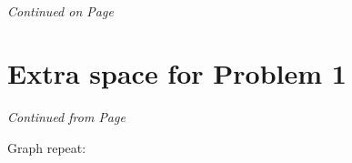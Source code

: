 \documentclass[11pt]{article}
\begin{document}
\label{pg:end-of-p5}


%
\paragraph{} \emph{Continued on Page \pageref{pg:p5-continuation}}


\newpage







\newpage



\section*{Extra space for Problem 1}
\emph{Continued from Page \pageref{pg:end-of-p1}}\\


\label{pg:p1-continuation}

Graph repeat:
\end{document}
